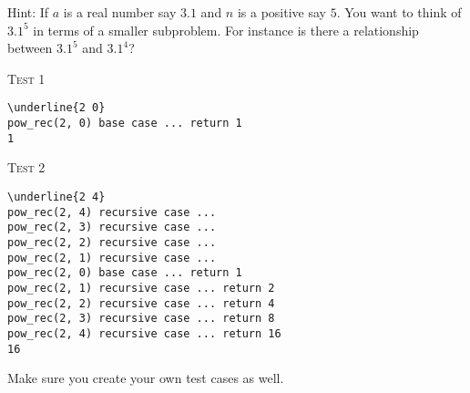 Hint:
If $a$ is a real number say $3.1$ and $n$ is a positive say $5$.
You want to think of $3.1^5$ in terms of a smaller subproblem.
For instance is there a relationship between $3.1^5$ and $3.1^4$?

\textsc{Test 1}
\begin{Verbatim}[frame=single, fontsize=\small, commandchars=\\\{\}]
\underline{2 0}
pow_rec(2, 0) base case ... return 1
1
\end{Verbatim}

\textsc{Test 2}
\begin{Verbatim}[frame=single, fontsize=\small, commandchars=\\\{\}]
\underline{2 4}
pow_rec(2, 4) recursive case ...
pow_rec(2, 3) recursive case ...
pow_rec(2, 2) recursive case ...
pow_rec(2, 1) recursive case ...
pow_rec(2, 0) base case ... return 1
pow_rec(2, 1) recursive case ... return 2
pow_rec(2, 2) recursive case ... return 4
pow_rec(2, 3) recursive case ... return 8
pow_rec(2, 4) recursive case ... return 16
16
\end{Verbatim}

Make sure you create your own test cases as well.
